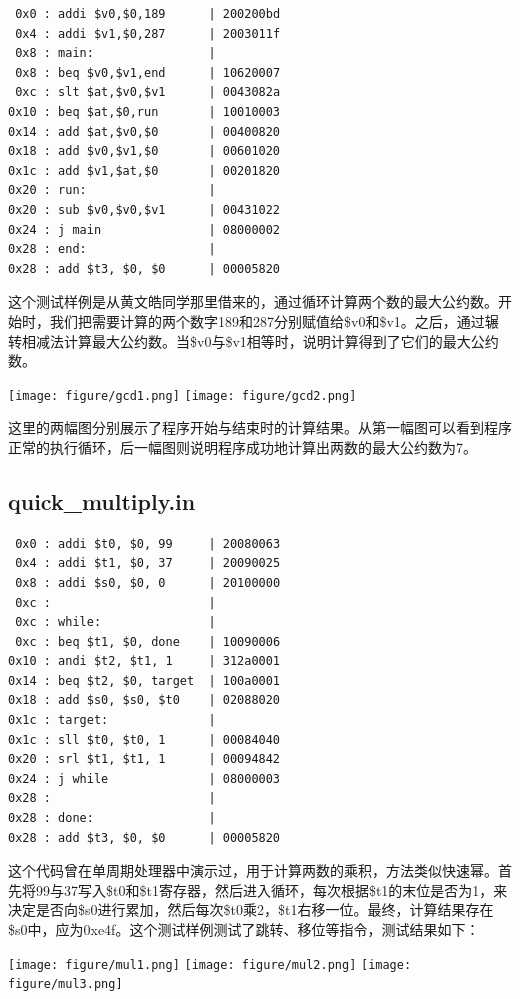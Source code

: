 \documentclass[12pt]{article} %
\begin{document}
\begin{sloppypar}
\begin{lstlisting}
 0x0 : addi $v0,$0,189      | 200200bd
 0x4 : addi $v1,$0,287      | 2003011f
 0x8 : main:                | 
 0x8 : beq $v0,$v1,end      | 10620007
 0xc : slt $at,$v0,$v1      | 0043082a
0x10 : beq $at,$0,run       | 10010003
0x14 : add $at,$v0,$0       | 00400820
0x18 : add $v0,$v1,$0       | 00601020
0x1c : add $v1,$at,$0       | 00201820
0x20 : run:                 | 
0x20 : sub $v0,$v0,$v1      | 00431022
0x24 : j main               | 08000002
0x28 : end:                 | 
0x28 : add $t3, $0, $0      | 00005820

\end{lstlisting}

这个测试样例是从黄文皓同学那里借来的，通过循环计算两个数的最大公约数。开始时，我们把需要计算的两个数字189和287分别赋值给\$v0和\$v1。之后，通过辗转相减法计算最大公约数。当\$v0与\$v1相等时，说明计算得到了它们的最大公约数。

\noindent
\texttt{[image: figure/gcd1.png]}
\texttt{[image: figure/gcd2.png]}

这里的两幅图分别展示了程序开始与结束时的计算结果。从第一幅图可以看到程序正常的执行循环，后一幅图则说明程序成功地计算出两数的最大公约数为7。


\subsection{quick\_multiply.in}

\begin{lstlisting}
 0x0 : addi $t0, $0, 99     | 20080063
 0x4 : addi $t1, $0, 37     | 20090025
 0x8 : addi $s0, $0, 0      | 20100000
 0xc :                      | 
 0xc : while:               | 
 0xc : beq $t1, $0, done    | 10090006
0x10 : andi $t2, $t1, 1     | 312a0001
0x14 : beq $t2, $0, target  | 100a0001
0x18 : add $s0, $s0, $t0    | 02088020
0x1c : target:              | 
0x1c : sll $t0, $t0, 1      | 00084040
0x20 : srl $t1, $t1, 1      | 00094842
0x24 : j while              | 08000003
0x28 :                      | 
0x28 : done:                | 
0x28 : add $t3, $0, $0      | 00005820
\end{lstlisting} 

这个代码曾在单周期处理器中演示过，用于计算两数的乘积，方法类似快速幂。首先将99与37写入\$t0和\$t1寄存器，然后进入循环，每次根据\$t1的末位是否为1，来决定是否向\$s0进行累加，然后每次\$t0乘2，\$t1右移一位。最终，计算结果存在\$s0中，应为0xe4f。这个测试样例测试了跳转、移位等指令，测试结果如下：

\noindent
\texttt{[image: figure/mul1.png]}
\texttt{[image: figure/mul2.png]}
\texttt{[image: figure/mul3.png]}


\end{sloppypar}
\end{document}
